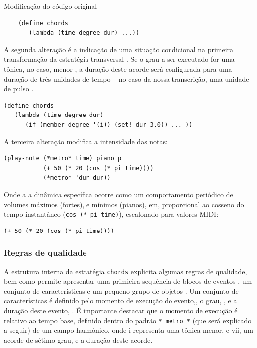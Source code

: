 \begin{example}{Modificação do código original}
\begin{verbatim}
    (define chords
       (lambda (time degree dur) ...))
\end{verbatim}

A segunda alteração é a indicação de uma situação condicional na primeira transformação da estratégia transversal . Se o grau a ser executado for uma tônica, no caso, menor , a duração deste acorde será configurada para uma duração de três unidades de tempo -- no caso da nossa transcrição, uma unidade de pulso .

\begin{verbatim}
(define chords
   (lambda (time degree dur)
      (if (member degree '(i)) (set! dur 3.0)) ... ))
\end{verbatim}

A terceira alteração modifica a intensidade das notas:

\begin{verbatim}
(play-note (*metro* time) piano p
           (+ 50 (* 20 (cos (* pi time))))
           (*metro* 'dur dur))
\end{verbatim}

Onde a a dinâmica específica ocorre como um comportamento periódico de volumes máximos (fortes), e mínimos (pianos), em, proporcional ao cosseno do tempo instantâneo (\verb|cos (* pi time)|), escalonado para valores MIDI:

\begin{verbatim}
(+ 50 (* 20 (cos (* pi time))))
\end{verbatim}
\end{example}

\subsubsection{Regras de qualidade}\label{sec:regras_qualidade}

A estrutura interna da estratégia \verb|chords| explicita algumas regras de qualidade, bem como permite apresentar uma primieira sequência de blocos de eventos , um conjunto de características  e um pequeno grupo de objetos . Um conjunto de características é definido pelo momento de execução do evento,, o grau, , e a duração deste evento, . É importante destacar que o momento de execução é relativo ao tempo base, definido dentro do padrão \verb|* metro *| (que será explicado a seguir) de um campo harmônico, onde i representa uma tônica menor, e vii, um acorde de sétimo grau, e a duração deste acorde.


